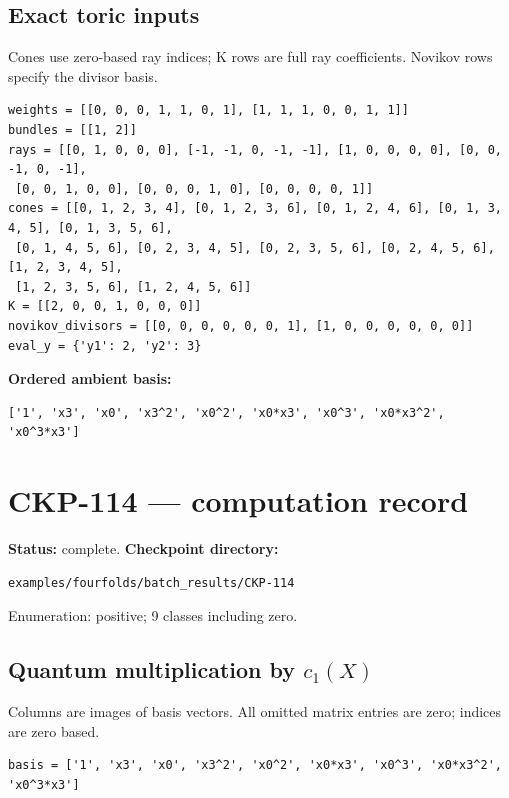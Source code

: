 \documentclass[10pt,a4paper]{article}
\begin{document}
\subsection*{Exact toric inputs}
Cones use zero-based ray indices; K rows are full ray coefficients. Novikov rows specify the divisor basis.

\begin{lstlisting}
weights = [[0, 0, 0, 1, 1, 0, 1], [1, 1, 1, 0, 0, 1, 1]]
bundles = [[1, 2]]
rays = [[0, 1, 0, 0, 0], [-1, -1, 0, -1, -1], [1, 0, 0, 0, 0], [0, 0, -1, 0, -1],
 [0, 0, 1, 0, 0], [0, 0, 0, 1, 0], [0, 0, 0, 0, 1]]
cones = [[0, 1, 2, 3, 4], [0, 1, 2, 3, 6], [0, 1, 2, 4, 6], [0, 1, 3, 4, 5], [0, 1, 3, 5, 6],
 [0, 1, 4, 5, 6], [0, 2, 3, 4, 5], [0, 2, 3, 5, 6], [0, 2, 4, 5, 6], [1, 2, 3, 4, 5],
 [1, 2, 3, 5, 6], [1, 2, 4, 5, 6]]
K = [[2, 0, 0, 1, 0, 0, 0]]
novikov_divisors = [[0, 0, 0, 0, 0, 0, 1], [1, 0, 0, 0, 0, 0, 0]]
eval_y = {'y1': 2, 'y2': 3}
\end{lstlisting}

\textbf{Ordered ambient basis:}
\begin{lstlisting}
['1', 'x3', 'x0', 'x3^2', 'x0^2', 'x0*x3', 'x0^3', 'x0*x3^2', 'x0^3*x3']
\end{lstlisting}

\clearpage\section*{CKP-114 --- computation record}
\textbf{Status:} complete.
\textbf{Checkpoint directory:}
\begin{lstlisting}
examples/fourfolds/batch_results/CKP-114
\end{lstlisting}

Enumeration: positive; 9 classes including zero.
\subsection*{Quantum multiplication by $c_1(X)$}
Columns are images of basis vectors. All omitted matrix entries are zero; indices are zero based.

\begin{lstlisting}
basis = ['1', 'x3', 'x0', 'x3^2', 'x0^2', 'x0*x3', 'x0^3', 'x0*x3^2', 'x0^3*x3']
\end{lstlisting}
\end{document}
